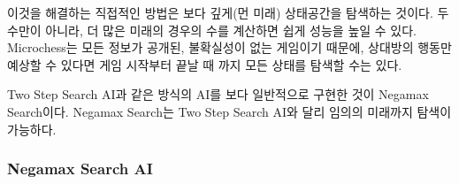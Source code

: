 \documentclass[letterpaper,10pt,english]{sphinxmanual}
\begin{document}
이것을 해결하는 직접적인 방법은 보다 깊게(먼 미래) 상태공간을 탐색하는 것이다.
두 수만이 아니라, 더 많은 미래의 경우의 수를 계산하면 쉽게 성능을 높일 수 있다.
Microchess는 모든 정보가 공개된, 불확실성이 없는 게임이기 때문에, 상대방의 행동만 예상할 수 있다면
게임 시작부터 끝날 때 까지 모든 상태를 탐색할 수는 있다.

Two Step Search AI과 같은 방식의 AI를 보다 일반적으로 구현한 것이 Negamax Search이다.
Negamax Search는 Two Step Search AI와 달리 임의의 미래까지 탐색이 가능하다.


\subsubsection{Negamax Search AI}
\label{\detokenize{03-basic_ai_examples:negamax-search-ai}}
\def\sphinxLiteralBlockLabel{\label{\detokenize{03-basic_ai_examples:negamax-search-code}}\label{\detokenize{03-basic_ai_examples:id34}}}
%
\end{document}
